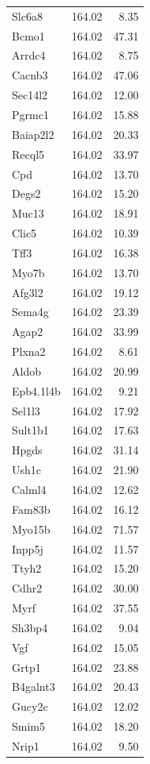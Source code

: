 \documentclass[oneside]{book}\usepackage[]{graphicx}\usepackage[]{color}
\begin{document}
{\begin{longtable}{lrr}
  Slc6a8 & 164.02 & 8.35 \\
  Bcmo1 & 164.02 & 47.31 \\
  Arrdc4 & 164.02 & 8.75 \\
  Cacnb3 & 164.02 & 47.06 \\
  Sec14l2 & 164.02 & 12.00 \\
  Pgrmc1 & 164.02 & 15.88 \\
  Baiap2l2 & 164.02 & 20.33 \\
  Recql5 & 164.02 & 33.97 \\
  Cpd & 164.02 & 13.70 \\
  Degs2 & 164.02 & 15.20 \\
  Muc13 & 164.02 & 18.91 \\
  Clic5 & 164.02 & 10.39 \\
  Tff3 & 164.02 & 16.38 \\
  Myo7b & 164.02 & 13.70 \\
  Afg3l2 & 164.02 & 19.12 \\
  Sema4g & 164.02 & 23.39 \\
  Agap2 & 164.02 & 33.99 \\
  Plxna2 & 164.02 & 8.61 \\
  Aldob & 164.02 & 20.99 \\
  Epb4.1l4b & 164.02 & 9.21 \\
  Sel1l3 & 164.02 & 17.92 \\
  Sult1b1 & 164.02 & 17.63 \\
  Hpgds & 164.02 & 31.14 \\
  Ush1c & 164.02 & 21.90 \\
  Calml4 & 164.02 & 12.62 \\
  Fam83b & 164.02 & 16.12 \\
  Myo15b & 164.02 & 71.57 \\
  Inpp5j & 164.02 & 11.57 \\
  Ttyh2 & 164.02 & 15.20 \\
  Cdhr2 & 164.02 & 30.00 \\
  Myrf & 164.02 & 37.55 \\
  Sh3bp4 & 164.02 & 9.04 \\
  Vgf & 164.02 & 15.05 \\
  Grtp1 & 164.02 & 23.88 \\
  B4galnt3 & 164.02 & 20.43 \\
  Gucy2c & 164.02 & 12.02 \\
  Smim5 & 164.02 & 18.20 \\
  Nrip1 & 164.02 & 9.50 \\

\end{longtable}}
\end{document}
